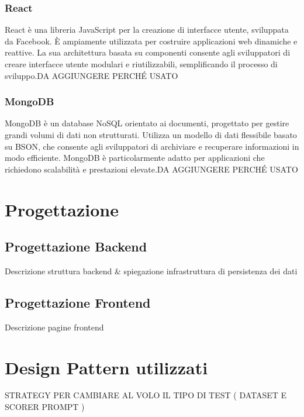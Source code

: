 \subsubsection*{React}
React è una libreria JavaScript per la creazione di interfacce utente, sviluppata da Facebook. È ampiamente utilizzata per costruire applicazioni web dinamiche e reattive. La sua architettura basata su componenti consente agli sviluppatori di creare interfacce utente modulari e riutilizzabili, semplificando il processo di sviluppo.DA AGGIUNGERE PERCHÉ USATO

\subsubsection*{MongoDB}
MongoDB è un database NoSQL orientato ai documenti, progettato per gestire grandi volumi di dati non strutturati. Utilizza un modello di dati flessibile basato su BSON, che consente agli sviluppatori di archiviare e recuperare informazioni in modo efficiente. MongoDB è particolarmente adatto per applicazioni che richiedono scalabilità e prestazioni elevate.DA AGGIUNGERE PERCHÉ USATO

\section{Progettazione}
\label{sec:progettazione}

\subsection{Progettazione Backend} %
Descrizione struttura backend \& spiegazione infrastruttura di persistenza dei dati

\subsection{Progettazione Frontend} %
Descrizione pagine frontend


\section{Design Pattern utilizzati}

STRATEGY PER CAMBIARE AL VOLO IL TIPO DI TEST ( DATASET E SCORER PROMPT )

